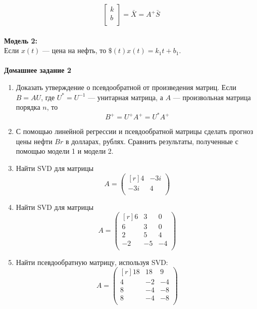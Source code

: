 \documentclass[12pt]{article}
\theoremstyle{definition}
\numberwithin{equation}{section}
\begin{document}
\[\begin{bmatrix}
k\\         
b\\
\end{bmatrix} = \bar X = A^+\bar S\]\\
\textbf{Модель 2:}\\
Если $x(t)$ --- цена на нефть, то $\$(t)x(t)=k_1t+b_1$.\\
\\
\textbf{Домашнее задание 2}
\begin{enumerate}
\item
Доказать утверждение о псевдообратной от произведения матриц.
Если $B=AU$, где $U^*=U^{-1}$ --- унитарная матрица, а $A$ --- произвольная матрица порядка $n$, то $$B^+=U^+A^+=U^*A^+$$ 
\item
С помощью линейной регрессии и псевдообратной матрицы сделать прогноз цены нефти $Br$ в долларах, рублях. Сравнить результаты, полученные с помощью модели 1 и модели 2.
\item
Найти SVD для матрицы\\
\[A=\begin{pmatrix}[r]
4 & -3i\\
-3i & 4\\
\end{pmatrix}\]
\item
Найти SVD для матрицы\\
\[A=\begin{pmatrix}[r]
6 & 3 & 0\\
6 & 3 & 0\\
2 & 5 & 4\\
-2 & -5 & -4\\
\end{pmatrix}\]
\item
Найти псевдообратную матрицу, используя SVD:\\
\[A=\begin{pmatrix}[r]
18 & 18 & 9\\
4 & -2 & -4\\
8 & -4 & -8\\
8 & -4 & -8\\
\end{pmatrix}\]
\end{enumerate}
~\\
\end{document}
